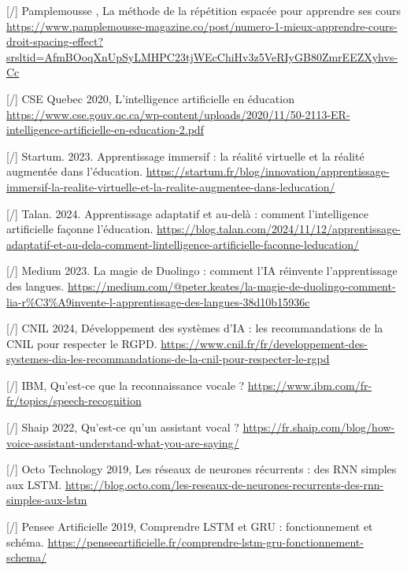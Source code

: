 \documentclass[11pt,a4paper]{report}
\begin{document}
\begin{thebibliography}{9}
        [/] Pamplemousse , La méthode de la répétition espacée pour apprendre ses cours \break
        \url{https://www.pamplemousse-magazine.co/post/numero-1-mieux-apprendre-cours-droit-spacing-effect?srsltid=AfmBOoqXnUpSyLMHPC23tjWEcChiHv3z5VeRIyGB80ZmrEEZXyhvs-Cc}
    
        [/] CSE Quebec 2020, L’intelligence artificielle en éducation
        \url{https://www.cse.gouv.qc.ca/wp-content/uploads/2020/11/50-2113-ER-intelligence-artificielle-en-education-2.pdf}
    
        [/] Startum. 2023. Apprentissage immersif : la réalité virtuelle et la réalité augmentée dans l'éducation. \break
        \url{https://startum.fr/blog/innovation/apprentissage-immersif-la-realite-virtuelle-et-la-realite-augmentee-dans-leducation/}
    
        [/] Talan. 2024. Apprentissage adaptatif et au-delà : comment l'intelligence artificielle façonne l'éducation. \break
        \url{https://blog.talan.com/2024/11/12/apprentissage-adaptatif-et-au-dela-comment-lintelligence-artificielle-faconne-leducation/}
    
        [/] Medium 2023. La magie de Duolingo : comment l'IA réinvente l'apprentissage des langues. \break
        \url{https://medium.com/@peter.keates/la-magie-de-duolingo-comment-lia-r%C3%A9invente-l-apprentissage-des-langues-38d10b15936c}

        [/] CNIL 2024, Développement des systèmes d’IA : les recommandations de la CNIL pour respecter le RGPD. \break
        \url{https://www.cnil.fr/fr/developpement-des-systemes-dia-les-recommandations-de-la-cnil-pour-respecter-le-rgpd}
    
        [/] IBM, Qu’est-ce que la reconnaissance vocale ? \break
        \url{https://www.ibm.com/fr-fr/topics/speech-recognition}
    
        [/] Shaip 2022, Qu'est-ce qu'un assistant vocal ? \break
        \url{https://fr.shaip.com/blog/how-voice-assistant-understand-what-you-are-saying/}
    
        [/] Octo Technology 2019, Les réseaux de neurones récurrents : des RNN simples aux LSTM. \break
        \url{https://blog.octo.com/les-reseaux-de-neurones-recurrents-des-rnn-simples-aux-lstm}
    
        [/] Pensee Artificielle 2019, Comprendre LSTM et GRU : fonctionnement et schéma. \break
        \url{https://penseeartificielle.fr/comprendre-lstm-gru-fonctionnement-schema/}
    

\end{thebibliography}
\end{document}
